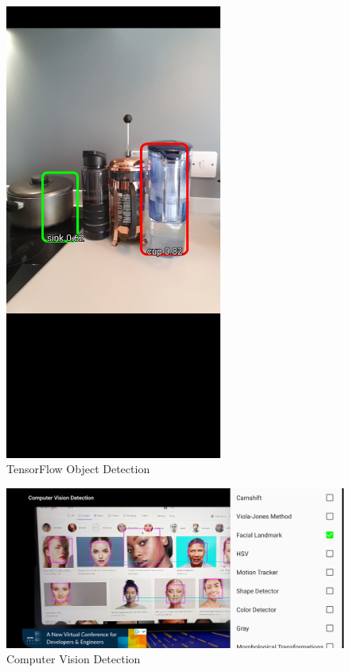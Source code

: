     \begin{figure}[!ht]
        \centering
        \includegraphics[width=2.8in]{images/chapter2/ml-detection-tf.jpg}
        \caption{TensorFlow Object Detection}
        \label{appendix:ts-obj-detection}
    \end{figure}

    \begin{figure}[!ht]
        \centering
        \includegraphics[width=5in]{images/chapter2/cv-detection.jpg}
        \caption{Computer Vision Detection}
        \label{appendix:cv-detection}
    \end{figure}